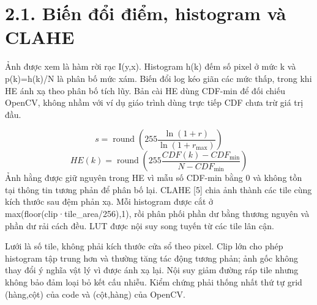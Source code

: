 \documentclass[13pt,a4paper]{extreport}
\begin{document}
\section*{2.1. Biến đổi điểm, histogram và CLAHE}
Ảnh được xem là hàm rời rạc I(y,x). Histogram h(k) đếm số pixel ở mức k và p(k)=h(k)/N là phân bố mức xám. Biến đổi log kéo giãn các mức thấp, trong khi HE ánh xạ theo phân bố tích lũy. Bản cài HE dùng CDF-min để đối chiếu OpenCV, không nhầm với ví dụ giáo trình dùng trực tiếp CDF chưa trừ giá trị đầu.
\par
\begin{equation}s=\operatorname{round}\left(255\frac{\ln(1+r)}{\ln(1+r_{\max})}\right)\tag{2.1}\end{equation}
\begin{equation}HE(k)=\operatorname{round}\left(255\frac{CDF(k)-CDF_{\min}}{N-CDF_{\min}}\right)\tag{2.2}\end{equation}
Ảnh hằng được giữ nguyên trong HE vì mẫu số CDF-min bằng 0 và không tồn tại thông tin tương phản để phân bố lại. CLAHE [5] chia ảnh thành các tile cùng kích thước sau đệm phản xạ. Mỗi histogram được cắt ở max(floor(clip·tile\_area/256),1), rồi phân phối phần dư bằng thương nguyên và phần dư rải cách đều. LUT được nội suy song tuyến từ các tile lân cận.
\par
Lưới là số tile, không phải kích thước cửa sổ theo pixel. Clip lớn cho phép histogram tập trung hơn và thường tăng tác động tương phản; ảnh gốc không thay đổi ý nghĩa vật lý vì được ánh xạ lại. Nội suy giảm đường ráp tile nhưng không bảo đảm loại bỏ kết cấu nhiễu. Kiểm chứng phải thống nhất thứ tự grid (hàng,cột) của code và (cột,hàng) của OpenCV.
\par
\clearpage
\end{document}
